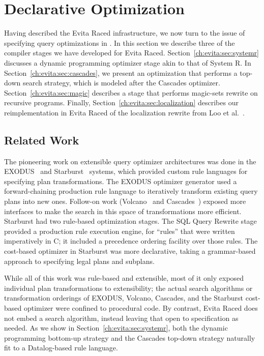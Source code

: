 \chapter[Declarative Optimization]{Declarative Optimization}
\label{ch:opt}

Having described the Evita Raced infrastructure, we now turn to the issue of
specifying query optimizations in \OVERLOG.  In this section we describe three
of the compiler stages we have developed for Evita Raced.
Section~\ref{ch:evita:sec:systemr} discusses a dynamic programming optimizer
stage akin to that of System R.  In Section~\ref{ch:evita:sec:cascades}, we
present an optimization that performs a top-down search strategy, which is
modeled after the Cascades optimizer.  Section~\ref{ch:evita:sec:magic}
describes a stage that performs magic-sets rewrite on recursive \OVERLOG
programs.  Finally, Section~\ref{ch:evita:sec:localization} describes our
reimplementation in Evita Raced of the localization rewrite from Loo et
al.~\cite{loo-sigmod06}.


\section{Related Work}
\label{ch:evita:sec:related}

The pioneering work on extensible query optimizer architectures was done in the
EXODUS~\cite{exodus} and Starburst~\cite{lohman,phh92} systems, which provided
custom rule languages for specifying plan transformations.  The EXODUS
optimizer generator used a forward-chaining production rule language to iteratively
transform existing query plans into new ones.  Follow-on work
(Volcano~\cite{volcano} and Cascades~\cite{cascades}) exposed more interfaces
to make the search in this space of transformations more efficient.  Starburst
had two rule-based optimization stages.  The SQL Query Rewrite stage provided a
production rule execution engine, for ``rules'' that were written imperatively
in C; it included a precedence ordering facility over those rules.  The
cost-based optimizer in Starburst was more declarative, taking a grammar-based
approach to specifying legal plans and subplans.

While all of this work was rule-based and extensible, most of it only exposed
individual plan transformations to extensibility; the actual search algorithms
or transformation orderings of EXODUS, Volcano, Cascades, and the Starburst
cost-based optimizer were confined to procedural code.  By contrast, Evita Raced
does not embed a search algorithm, instead leaving that open to specification
as needed.  As we show in Section~\ref{ch:evita:sec:systemr}, both the dynamic programming
bottom-up strategy and the Cascades top-down strategy naturally fit to a
Datalog-based rule language.

